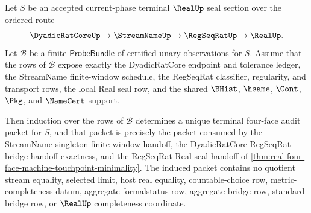 \begin{theorem}
\label{thm:real-l10-finite-bundle-induction}
Let $S$ be an accepted current-phase terminal $\RealUp$ seal section over the ordered route
$$
\DyadicRatCoreUp \to \StreamNameUp \to \RegSeqRatUp \to \RealUp .
$$
Let $\mathcal B$ be a finite $\mathsf{ProbeBundle}$ of certified unary observations for $S$. Assume that the rows of $\mathcal B$ expose exactly the DyadicRatCore endpoint and tolerance ledger, the StreamName finite-window schedule, the RegSeqRat classifier, regularity, and transport rows, the local Real seal row, and the shared $\BHist$, $\hsame$, $\Cont$, $\Pkg$, and $\NameCert$ support.

Then induction over the rows of $\mathcal B$ determines a unique terminal four-face audit packet for $S$, and that packet is precisely the packet consumed by the StreamName singleton finite-window handoff, the DyadicRatCore RegSeqRat bridge handoff exactness, and the RegSeqRat Real seal handoff of \autoref{thm:real-four-face-machine-touchpoint-minimality}. The induced packet contains no quotient stream equality, selected limit, host real equality, countable-choice row, metric-completeness datum, aggregate formalstatus row, aggregate bridge row, standard bridge row, or $\RealUp$ completeness coordinate.
\end{theorem}
